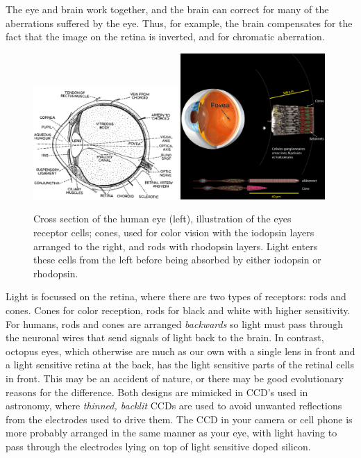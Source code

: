 The eye and brain work together, and the brain can correct for many of
the aberrations suffered by the eye. Thus, for example, the brain compensates for
the fact that the image on the retina is inverted, and for chromatic
aberration. 

\begin{figure}[h!]
\includegraphics[width=0.49\textwidth]{eye-schematic.eps}
\includegraphics[width=0.49\textwidth]{eye-rod-cone.eps}
\caption{Cross section of the human eye (left), illustration of the eyes
receptor cells; cones, used for color vision with the iodopsin layers 
arranged to the right, and rods with rhodopsin layers. Light enters these
cells from the left before being absorbed by either iodopsin or rhodopsin.}
\end{figure}

Light is focussed on the retina, where there are two types of
receptors: rods and cones. Cones for color reception, rods for black
and white with higher sensitivity. For humans, rods and cones are
arranged {\it backwards} so light must pass through the neuronal wires
that send signals of light back to the brain. In contrast, octopus
eyes, which otherwise are much as our own with a single lens in front
and a light sensitive retina at the back, has the light sensitive
parts of the retinal cells in front. This may be an accident of
nature, or there may be good evolutionary reasons for
the difference. Both designs are mimicked in CCD's used in astronomy,
where {\it thinned, backlit} CCDs are used to avoid unwanted reflections from
the electrodes used to drive them. The CCD in your camera or cell
phone is more probably arranged in the same manner as your eye, with
light having to pass through the electrodes lying on top of light
sensitive doped silicon.


